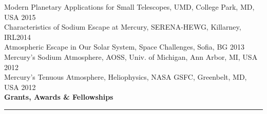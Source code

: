 \documentclass[12pt]{report}
\begin{document}
\noindent Modern Planetary Applications for Small Telescopes, UMD, College Park, MD, USA \hfill 2015\\
\noindent Characteristics of Sodium Escape at Mercury, SERENA-HEWG, Killarney, IRL\hfill 2014\\
\noindent Atmospheric Escape in Our Solar System, Space Challenges, Sofia, BG \hfill 2013\\
\noindent Mercury's Sodium Atmosphere, AOSS, Univ. of Michigan, Ann Arbor, MI, USA \hfill 2012\\
\noindent Mercury's Tenuous Atmosphere, Heliophysics, NASA GSFC, Greenbelt, MD, USA \hfill 2012\\

\noindent\bf{Grants, Awards \& Fellowships}\rm \hspace*{\fill} \\
\rule{\textwidth}{1pt}
\end{document}
